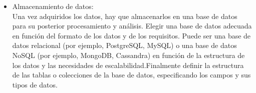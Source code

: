 \begin{itemize}
\item Almacenamiento de datos:\\
Una vez adquiridos los datos, hay que almacenarlos en una base de datos para su posterior procesamiento y análisis. Elegir una base de datos adecuada en función del formato de los datos y de los requisitos. Puede ser una base de datos relacional (por ejemplo, PostgreSQL, MySQL) o una base de datos NoSQL (por ejemplo, MongoDB, Cassandra) en función de la estructura de los datos y las necesidades de escalabilidad.Finalmente definir la estructura de las tablas o colecciones de la base de datos, especificando los campos y sus tipos de datos. 

\end{itemize}